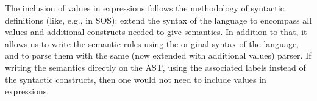 \documentclass{article}
\begin{document}
\begin{kdefinition}
\begin{module}{}
\begin{syntaxBlock}{}
\end{syntaxBlock}

\begin{syntaxBlock}{}
\end{syntaxBlock}

\begin{syntaxBlock}{}
\end{syntaxBlock}
\begin{kblock}[text]
 The inclusion of values in expressions follows the methodology of
syntactic definitions (like, e.g., in SOS): extend the syntax of the language
to encompass all values and additional constructs needed to give semantics.
In addition to that, it allows us to write the semantic rules using the
original syntax of the language, and to parse them with the same (now extended
with additional values) parser.  If writing the semantics directly on the \K
AST, using the associated labels instead of the syntactic constructs, then one
would not need to include values in expressions. \end{kblock}
\begin{kblock}[text]

\end{kblock}
\end{module}
\end{kdefinition}
\end{document}
